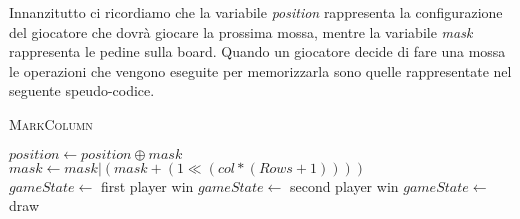 \documentclass[a4paper]{article}
\begin{document}
Innanzitutto ci ricordiamo che la variabile \emph{position} rappresenta la 
configurazione del giocatore che dovrà giocare la prossima mossa, mentre la 
variabile \emph{mask} rappresenta le pedine sulla board. Quando un giocatore
decide di fare una mossa le operazioni che vengono eseguite per memorizzarla
sono quelle rappresentate nel seguente speudo-codice.

\begin{algorithm}
  \caption{\textsc{MarkColumn}}
  \begin{algorithmic}
      \State $position \gets position \oplus mask$
      \State $mask \gets mask | (mask + (1 \ll (col * (Rows + 1))))$
      \\
          \State $gameState \gets $ first player win
        \Else
          \State $gameState \gets $ second player win 
        \EndIf
          \State $gameState \gets $ draw
      \EndIf
    \EndFunction
  \end{algorithmic}
\end{algorithm}
\end{document}
